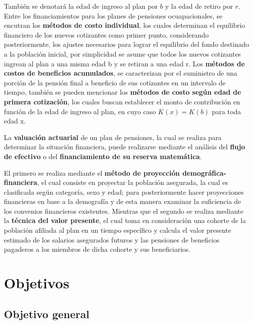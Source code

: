 \documentclass[12pt,letterpaper,titlepage]{article}
\begin{document}
También se denotará la edad de ingreso al plan por $b$ y la edad de retiro por $r$. Entre los financiamientos para los planes de pensiones ocuapacionales, se encutran los \textbf{métodos de costo individual}, los cuales determinan el equilibrio financiero de los nuevos cotizantes como primer punto, considerando posteriormente, los ajustes necesarios para lograr el equilibrio del fondo destinado a la población inicial, por simplicidad se asume que todos los nuevos cotizantes ingrean al plan a una misma edad b y se retiran a una edad r. Los \textbf{métodos de costos de beneficios acumulados}, se caracterizan por el suministro de una porción de la pensión final a beneficio de sus cotizantes en un intervalo de tiempo, también se pueden mencionar los \textbf{métodos de costo según edad de primera cotización}, los cuales buscan establecer el monto de contribución en función de la edad de ingreso al plan, en cuyo caso $K(x)=K(b)$ para toda edad x.


La \textbf{valuación actuarial} de un plan de pensiones, la cual se realiza para determinar la situación financiera, puede realizarse mediante el análisis del \textbf{flujo de efectivo} o del \textbf{financiamiento de su reserva matemática}.

El primero se realiza mediante el \textbf{método de proyección demográfica-financiera}, el cual consiste en proyectar la población asegurada, la cual es clasificada según categoría, sexo y edad; para posteriormente hacer proyecciones financieras en base a la demografía y de esta manera examinar la suficiencia de los convenios financieros existentes. Mientras que el segundo se realiza mediante la \textbf{técnica del valor presente}, el cual toma en consideración una cohorte de la población afiliada al plan en un tiempo específico y calcula el valor presente estimado de los salarios asegurados futuros y las pensiones de beneficios pagaderos a los miembros de dicha cohorte y sus beneficiarios.

\newpage

\section{Objetivos}


\subsection{Objetivo general}
\end{document}
